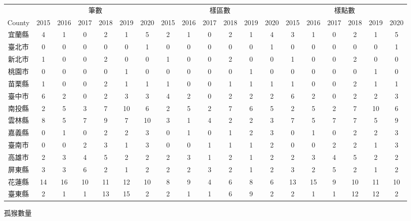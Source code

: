 \documentclass[
]{article}
\begin{document}
\begin{table}[H]
\centering
\begin{tabular}[t]{c|c|c|c|c|c|c|c|c|c|c|c|c|c|c|c|c|c|c}
\hline
\multicolumn{1}{c|}{ } & \multicolumn{6}{c|}{筆數} & \multicolumn{6}{c|}{樣區數} & \multicolumn{6}{c}{樣點數} \\
\cline{2-7} \cline{8-13} \cline{14-19}
County &  2015 &  2016 &  2017 &  2018 &  2019 &  2020 &  2015 &  2016 &  2017 &  2018 &  2019 &  2020 &  2015 &  2016 &  2017 &  2018 &  2019 &  2020\\
\hline
宜蘭縣 & 4 & 1 & 0 & 2 & 1 & 5 & 2 & 1 & 0 & 2 & 1 & 4 & 3 & 1 & 0 & 2 & 1 & 5\\
\hline
臺北市 & 0 & 0 & 0 & 0 & 0 & 1 & 0 & 0 & 0 & 0 & 0 & 1 & 0 & 0 & 0 & 0 & 0 & 1\\
\hline
新北市 & 1 & 0 & 0 & 2 & 0 & 0 & 1 & 0 & 0 & 2 & 0 & 0 & 1 & 0 & 0 & 2 & 0 & 0\\
\hline
桃園市 & 0 & 0 & 0 & 0 & 1 & 0 & 0 & 0 & 0 & 0 & 1 & 0 & 0 & 0 & 0 & 0 & 1 & 0\\
\hline
苗栗縣 & 1 & 0 & 0 & 2 & 1 & 1 & 1 & 0 & 0 & 1 & 1 & 1 & 1 & 0 & 0 & 2 & 1 & 1\\
\hline
臺中市 & 6 & 2 & 0 & 2 & 3 & 3 & 4 & 2 & 0 & 2 & 2 & 2 & 6 & 2 & 0 & 2 & 2 & 3\\
\hline
南投縣 & 2 & 5 & 3 & 7 & 10 & 6 & 2 & 5 & 2 & 7 & 6 & 5 & 2 & 5 & 2 & 7 & 10 & 6\\
\hline
雲林縣 & 8 & 5 & 7 & 9 & 7 & 10 & 3 & 1 & 4 & 2 & 2 & 3 & 7 & 5 & 7 & 7 & 5 & 9\\
\hline
嘉義縣 & 0 & 1 & 0 & 2 & 2 & 3 & 0 & 1 & 0 & 1 & 2 & 3 & 0 & 1 & 0 & 2 & 2 & 3\\
\hline
臺南市 & 0 & 0 & 2 & 3 & 1 & 3 & 0 & 0 & 1 & 1 & 1 & 2 & 0 & 0 & 2 & 2 & 1 & 3\\
\hline
高雄市 & 2 & 3 & 4 & 5 & 2 & 2 & 2 & 3 & 1 & 2 & 1 & 2 & 2 & 3 & 4 & 5 & 2 & 2\\
\hline
屏東縣 & 3 & 3 & 6 & 2 & 1 & 2 & 2 & 2 & 3 & 2 & 1 & 2 & 3 & 2 & 5 & 2 & 1 & 2\\
\hline
花蓮縣 & 14 & 16 & 10 & 11 & 12 & 10 & 8 & 9 & 4 & 6 & 8 & 6 & 13 & 15 & 9 & 10 & 11 & 10\\
\hline
臺東縣 & 2 & 1 & 1 & 13 & 15 & 2 & 2 & 1 & 1 & 6 & 9 & 2 & 2 & 1 & 1 & 12 & 12 & 2\\
\hline
\end{tabular}
\end{table}

孤猴數量
\end{document}
